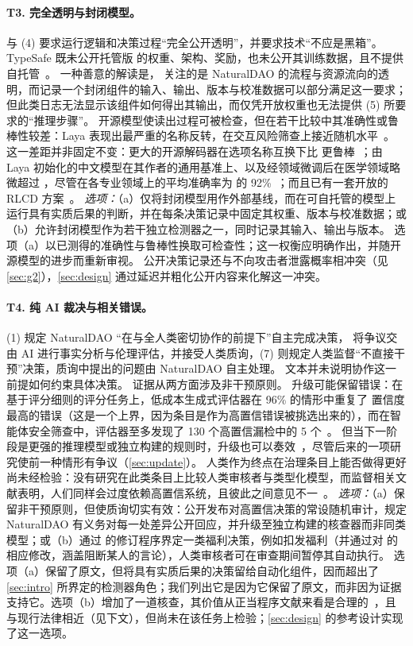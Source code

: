 \paragraph{T3. 完全透明与封闭模型。}
 与 (4) 要求运行逻辑和决策过程“完全公开透明”，并要求技术“不应是黑箱”。
TypeSafe 既未公开托管版 \jev{} 的权重、架构、奖励，也未公开其训练数据，且不提供自托管~\cite{arx24574,arx28919,arx00346}。
一种善意的解读是， 关注的是 NaturalDAO 的流程与资源流向的透明，而记录一个封闭组件的输入、输出、版本与校准数据可以部分满足这一要求；但此类日志无法显示该组件如何得出其输出，而仅凭开放权重也无法提供 (5) 所要求的“推理步骤”。
开源模型使读出过程可被检查，但在若干比较中其准确性或鲁棒性较差：Laya 表现出最严重的名称反转，在交互风险筛查上接近随机水平~\cite{arx26758,arx33401}。
这一差距并非固定不变：更大的开源解码器在选项名称互换下比 \jev{} 更鲁棒~\cite{arx00346}；由 Laya 初始化的中文模型在其作者的通用基准上、以及经领域微调后在医学领域略微超过 \jev{}，尽管在各专业领域上的平均准确率为 \jev{} 的 92\%~\cite{arx36965}；而且已有一套开放的 RLCD 方案~\cite{arx38850}。
\emph{选项：}（a）仅将封闭模型用作外部基线，而在可自托管的模型上运行具有实质后果的判断，并在每条决策记录中固定其权重、版本与校准数据；或（b）允许封闭模型作为若干独立检测器之一，同时记录其输入、输出与版本。
选项（a）以已测得的准确性与鲁棒性换取可检查性；这一权衡应明确作出，并随开源模型的进步而重新审视。
公开决策记录还与不向攻击者泄露概率相冲突（见\cref{sec:g2}），\cref{sec:design} 通过延迟并粗化公开内容来化解这一冲突。

\paragraph{T4. 纯 AI 裁决与相关错误。}
(1) 规定 NaturalDAO “在与全人类密切协作的前提下”自主完成决策， 将争议交由 AI 进行事实分析与伦理评估，并接受人类质询，(7) 则规定人类监督“不直接干预”决策，质询中提出的问题由 NaturalDAO 自主处理。
文本并未说明协作这一前提如何约束具体决策。
证据从两方面涉及非干预原则。
升级可能保留错误：在基于评分细则的评分任务上，低成本生成式评估器在 96\% 的情形中重复了 \jev{} 置信度最高的错误（这是一个上界，因为条目是作为高置信错误被挑选出来的），而在智能体安全筛查中，评估器至多发现了 130 个高置信漏检中的 5 个~\cite{arx29769,arx33401}。
但当下一阶段是更强的推理模型或独立构建的规则时，升级也可以奏效~\cite{arx26550,arx02048}，尽管后来的一项研究使前一种情形有争议（\cref{sec:update}）。
人类作为终点在治理条目上能否做得更好尚未经检验：没有研究在此类条目上比较人类审核者与类型化模型，而监督相关文献表明，人们同样会过度依赖高置信系统，且彼此之间意见不一~\cite{parasuraman2010complacency,green2022flaws,bansal2021whole}。
\emph{选项：}（a）保留非干预原则，但使质询切实有效：公开发布对高置信决策的常设随机审计，规定 NaturalDAO 有义务对每一处差异公开回应，并升级至独立构建的核查器而非同类模型；或（b）通过  的修订程序界定一类福利决策，例如扣发福利（并通过对  的相应修改，涵盖阻断某人的言论），人类审核者可在审查期间暂停其自动执行。
选项（a）保留了原文，但将具有实质后果的决策留给自动化组件，因而超出了\cref{sec:intro} 所界定的检测器角色；我们列出它是因为它保留了原文，而非因为证据支持它。选项（b）增加了一道核查，其价值从正当程序文献来看是合理的~\cite{citron2008technological}，且与现行法律相近（见下文），但尚未在该任务上检验；\cref{sec:design} 的参考设计实现了这一选项。

